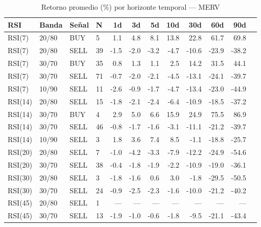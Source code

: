 %
\begin{table}[htbp]
    \centering
    \caption{Retorno promedio (\%) por horizonte temporal --- MERV}
    \label{tab:media_merv}
    \small
    \begin{tabular}{llllrrrrrrrr}
        \toprule
        \textbf{RSI} & \textbf{Banda} & \textbf{Se\~{n}al} & \textbf{N} & \textbf{1d} & \textbf{3d} & \textbf{5d} & \textbf{10d} & \textbf{30d} & \textbf{60d} & \textbf{90d} \\
        \midrule
        RSI(7) & 20/80 & BUY & 5 & 1.1 & 4.8 & 8.1 & 13.8 & 22.8 & 61.7 & 69.8 \\
        RSI(7) & 20/80 & SELL & 39 & -1.5 & -2.0 & -3.2 & -4.7 & -10.6 & -23.9 & -38.2 \\
        RSI(7) & 30/70 & BUY & 35 & 0.8 & 1.3 & 1.1 & 2.5 & 14.2 & 31.5 & 44.1 \\
        RSI(7) & 30/70 & SELL & 71 & -0.7 & -2.0 & -2.1 & -4.5 & -13.1 & -24.1 & -39.7 \\
        RSI(7) & 10/90 & SELL & 11 & -2.6 & -0.9 & -1.7 & -4.7 & -13.4 & -23.0 & -44.9 \\
        \midrule
        RSI(14) & 20/80 & SELL & 15 & -1.8 & -2.1 & -2.4 & -6.4 & -10.9 & -18.5 & -37.2 \\
        RSI(14) & 30/70 & BUY & 4 & 2.9 & 5.0 & 6.6 & 15.9 & 24.9 & 75.5 & 86.9 \\
        RSI(14) & 30/70 & SELL & 46 & -0.8 & -1.7 & -1.6 & -3.1 & -11.1 & -21.2 & -39.7 \\
        RSI(14) & 10/90 & SELL & 3 & 1.8 & 3.6 & 7.4 & 8.5 & -1.1 & -18.8 & -25.7 \\
        \midrule
        RSI(20) & 20/80 & SELL & 7 & -1.0 & -4.2 & -3.3 & -7.9 & -12.2 & -24.9 & -54.6 \\
        RSI(20) & 30/70 & SELL & 38 & -0.4 & -1.8 & -1.9 & -2.2 & -10.9 & -19.0 & -36.1 \\
        \midrule
        RSI(30) & 20/80 & SELL & 3 & -1.8 & -1.6 & 0.6 & 3.0 & -1.8 & -29.5 & -50.5 \\
        RSI(30) & 30/70 & SELL & 24 & -0.9 & -2.5 & -2.3 & -1.6 & -10.0 & -21.2 & -40.2 \\
        \midrule
        RSI(45) & 20/80 & SELL & 1 & --- & --- & --- & --- & --- & --- & --- \\
        RSI(45) & 30/70 & SELL & 13 & -1.9 & -1.0 & -0.6 & -1.8 & -9.5 & -21.1 & -43.4 \\
        \bottomrule
    \end{tabular}
\end{table}

